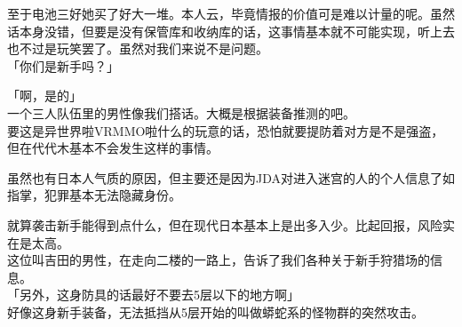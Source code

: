 至于电池三好她买了好大一堆。本人云，毕竟情报的价值可是难以计量的呢。虽然话本身没错，但要是没有保管库和收纳库的话，这事情基本就不可能实现，听上去也不过是玩笑罢了。虽然对我们来说不是问题。\\

「你们是新手吗？」

「啊，是的」\\

一个三人队伍里的男性像我们搭话。大概是根据装备推测的吧。\\

要这是异世界啦VRMMO啦什么的玩意的话，恐怕就要提防着对方是不是强盗，但在代代木基本不会发生这样的事情。

虽然也有日本人气质的原因，但主要还是因为JDA对进入迷宫的人的个人信息了如指掌，犯罪基本无法隐藏身份。

就算袭击新手能得到点什么，但在现代日本基本上是出多入少。比起回报，风险实在是太高。\\

这位叫吉田的男性，在走向二楼的一路上，告诉了我们各种关于新手狩猎场的信息。\\

「另外，这身防具的话最好不要去5层以下的地方啊」\\

好像这身新手装备，无法抵挡从5层开始的叫做蟒蛇系的怪物群的突然攻击。\\

